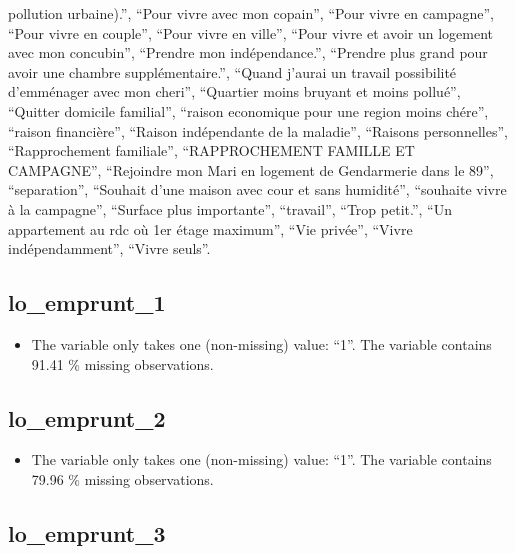 \documentclass[
  letterpaper,
  DIV=11,
  numbers=noendperiod]{scrartcl}
\providecommand{\tightlist}{%
  \setlength{\itemsep}{0pt}\setlength{\parskip}{0pt}}
\begin{document}
\begin{itemize}
  pollution urbaine).'', ``Pour vivre avec mon copain'', ``Pour vivre en
  campagne'', ``Pour vivre en couple'', ``Pour vivre en ville'', ``Pour
  vivre et avoir un logement avec mon concubin'', ``Prendre mon
  indépendance.'', ``Prendre plus grand pour avoir une chambre
  supplémentaire.'', ``Quand j'aurai un travail possibilité d'emménager
  avec mon cheri'', ``Quartier moins bruyant et moins pollué'',
  ``Quitter domicile familial'', ``raison economique pour une region
  moins chére'', ``raison financière'', ``Raison indépendante de la
  maladie'', ``Raisons personnelles'', ``Rapprochement familiale'',
  ``RAPPROCHEMENT FAMILLE ET CAMPAGNE'', ``Rejoindre mon Mari en
  logement de Gendarmerie dans le 89'', ``separation'', ``Souhait d'une
  maison avec cour et sans humidité'', ``souhaite vivre à la campagne'',
  ``Surface plus importante'', ``travail'', ``Trop petit.'', ``Un
  appartement au rdc où 1er étage maximum'', ``Vie privée'', ``Vivre
  indépendamment'', ``Vivre seuls''.
\end{itemize}

\fullline

\subsection{lo\_emprunt\_1}\label{lo_emprunt_1}

\begin{itemize}
\tightlist
\item
  The variable only takes one (non-missing) value: ``1''. The variable
  contains 91.41 \% missing observations.
\end{itemize}

\fullline

\subsection{lo\_emprunt\_2}\label{lo_emprunt_2}

\begin{itemize}
\tightlist
\item
  The variable only takes one (non-missing) value: ``1''. The variable
  contains 79.96 \% missing observations.
\end{itemize}

\fullline

\subsection{lo\_emprunt\_3}\label{lo_emprunt_3}
\end{document}
